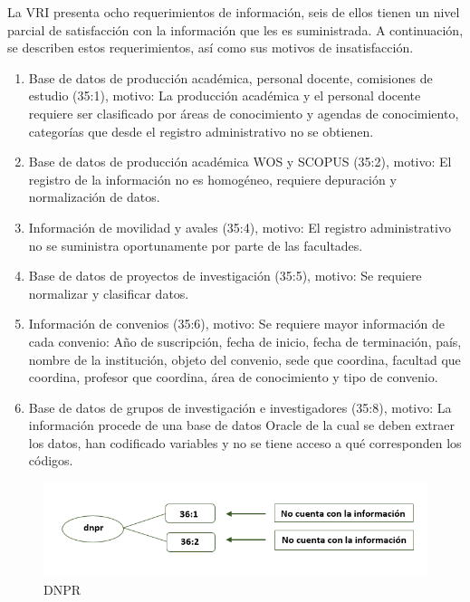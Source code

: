 \documentclass[
]{book}
\begin{document}
La VRI presenta ocho requerimientos de información, seis de ellos tienen un nivel parcial de
satisfacción con la información que les es suministrada. A continuación, se describen estos requerimientos, así como sus motivos de insatisfacción.

\begin{enumerate}
\def\labelenumi{\arabic{enumi}.}
\item
  Base de datos de producción académica, personal docente, comisiones de estudio (35:1),
  motivo: La producción académica y el personal docente requiere ser clasificado por áreas
  de conocimiento y agendas de conocimiento, categorías que desde el registro
  administrativo no se obtienen.
\item
  Base de datos de producción académica WOS y SCOPUS (35:2), motivo: El registro de la
  información no es homogéneo, requiere depuración y normalización de datos.
\item
  Información de movilidad y avales (35:4), motivo: El registro administrativo no se suministra
  oportunamente por parte de las facultades.
\item
  Base de datos de proyectos de investigación (35:5), motivo: Se requiere normalizar y
  clasificar datos.
\item
  Información de convenios (35:6), motivo: Se requiere mayor información de cada
  convenio: Año de suscripción, fecha de inicio, fecha de terminación, país, nombre de la institución, objeto del convenio, sede que coordina, facultad que coordina, profesor que coordina, área de conocimiento y tipo de convenio.
\item
  Base de datos de grupos de investigación e investigadores (35:8), motivo: La información
  procede de una base de datos Oracle de la cual se deben extraer los datos, han codificado
  variables y no se tiene acceso a qué corresponden los códigos.
\end{enumerate}

\begin{figure}

{\centering \includegraphics[width=0.75\linewidth]{Imagenes/ima7} 

}

\caption{DNPR}\label{fig:unnamed-chunk-35}
\end{figure}
\end{document}
